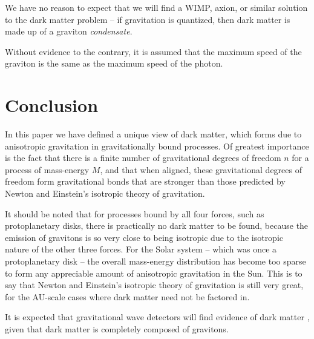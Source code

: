 \documentclass[12pt]{article}
\begin{document}
{We have no reason to expect that we will find a WIMP, axion, or similar solution \cite{berger, aalbers, quiskamp, haipeng, hui, ackerman} to the dark matter problem -- if gravitation is quantized, then dark matter is made up of a graviton {\textit{condensate}}.

Without evidence to the contrary, it is assumed that the maximum speed of the graviton is the same as the maximum speed of the photon.






\section{Conclusion}

In this paper we have defined a unique view of dark matter, which forms due to anisotropic gravitation in gravitationally bound processes.
Of greatest importance is the fact that there is a finite number of gravitational degrees of freedom $n$ for a process of mass-energy $M$, and that when aligned, these gravitational degrees of freedom form gravitational bonds that are stronger than those predicted by Newton and Einstein's isotropic theory of gravitation.

It should be noted that for processes bound by all four forces, such as protoplanetary disks, there is practically no dark matter to be found, because the emission of gravitons is so very close to being isotropic due to the isotropic nature of the other three forces.
For the Solar system -- which was once a protoplanetary disk -- the overall mass-energy distribution has become too sparse to form any appreciable amount of anisotropic gravitation in the Sun.
This is to say that Newton and Einstein's isotropic theory of gravitation is still very great, for the AU-scale cases where dark matter need not be factored in.

It is expected that gravitational wave detectors will find evidence of dark matter \cite{LIGO}, given that dark matter is completely composed of gravitons.







\pagebreak





}
\end{document}
